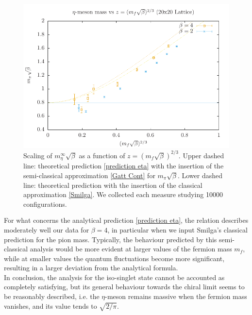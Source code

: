 \begin{figure}
    \centering
    \includegraphics{images/scaling_eta.pdf}
    \caption{Scaling of $m_\eta^\infty\sqrt{\beta}$ as a function of $z = (m_f \sqrt{\beta})^{2/3}$. Upper dashed line: theoretical prediction \eqref{prediction eta} with the insertion of the semi-classical approximation \eqref{Gatt Cont} for $m_\pi\sqrt{\beta}$. Lower dashed line: theoretical prediction with the insertion of the classical approximation \eqref{Smilga}. We collected each measure studying 10000 configurations.}
    \label{fig: scaling eta}
\end{figure}
For what concerns the analytical prediction \eqref{prediction eta}, the relation describes moderately well our data for $\beta = 4$, in particular when we input Smilga's classical prediction for the pion mass. Typically, the behaviour predicted by this semi-classical analysis would be more evident at larger values of the fermion mass $m_f$, while at smaller values the quantum fluctuations become more significant, resulting in a larger deviation from the analytical formula.
\\ In conclusion, the analysis for the iso-singlet state cannot be accounted as completely satisfying, but its general behaviour towards the chiral limit seems to be reasonably described, i.e. the $\eta$-meson remains massive when the fermion mass vanishes, and its value tends to $\sqrt{2/\pi}$.